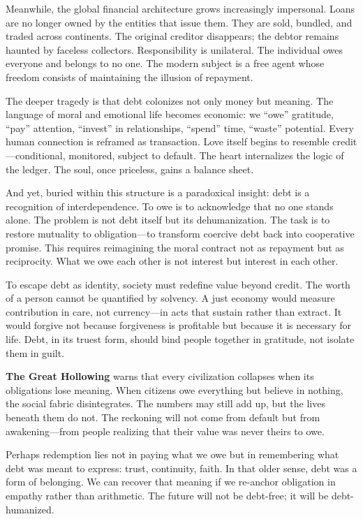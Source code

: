 \documentclass[11pt,twoside]{book}
\begin{document}
Meanwhile, the global financial architecture grows increasingly impersonal.  Loans are no longer owned by the entities that issue them.  They are sold, bundled, and traded across continents.  The original creditor disappears; the debtor remains haunted by faceless collectors.  Responsibility is unilateral.  The individual owes everyone and belongs to no one.  The modern subject is a free agent whose freedom consists of maintaining the illusion of repayment.

The deeper tragedy is that debt colonizes not only money but meaning.  The language of moral and emotional life becomes economic: we “owe” gratitude, “pay” attention, “invest” in relationships, “spend” time, “waste” potential.  Every human connection is reframed as transaction.  Love itself begins to resemble credit—conditional, monitored, subject to default.  The heart internalizes the logic of the ledger.  The soul, once priceless, gains a balance sheet.

And yet, buried within this structure is a paradoxical insight: debt is a recognition of interdependence.  To owe is to acknowledge that no one stands alone.  The problem is not debt itself but its dehumanization.  The task is to restore mutuality to obligation—to transform coercive debt back into cooperative promise.  This requires reimagining the moral contract not as repayment but as reciprocity.  What we owe each other is not interest but interest in each other.

To escape debt as identity, society must redefine value beyond credit.  The worth of a person cannot be quantified by solvency.  A just economy would measure contribution in care, not currency—in acts that sustain rather than extract.  It would forgive not because forgiveness is profitable but because it is necessary for life.  Debt, in its truest form, should bind people together in gratitude, not isolate them in guilt.

\textbf{The Great Hollowing} warns that every civilization collapses when its obligations lose meaning.  When citizens owe everything but believe in nothing, the social fabric disintegrates.  The numbers may still add up, but the lives beneath them do not.  The reckoning will not come from default but from awakening—from people realizing that their value was never theirs to owe.

Perhaps redemption lies not in paying what we owe but in remembering what debt was meant to express: trust, continuity, faith.  In that older sense, debt was a form of belonging.  We can recover that meaning if we re-anchor obligation in empathy rather than arithmetic.  The future will not be debt-free; it will be debt-humanized.
\end{document}
